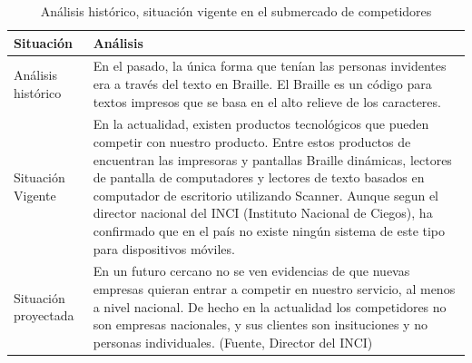 \documentclass[a4paper, 12pt, oneside]{article}
\begin{document}
	\begin{table}
		\caption{Análisis histórico, situación vigente en el submercado de competidores}
		\begin{tabular}{ | p{4cm} | p{10cm} | }
		\hline
		Situación & Análisis \\
		\hline					
		Análisis histórico & 
		En el pasado, la única forma que tenían las personas invidentes era a través del texto en Braille. El Braille es un código para textos impresos que se basa en el alto relieve de los caracteres. \\
		\hline
		Situación Vigente &
		En la actualidad, existen productos tecnológicos que pueden competir con nuestro producto. Entre estos productos de encuentran las impresoras y pantallas Braille dinámicas, lectores de pantalla de computadores y lectores de texto basados en computador de escritorio utilizando Scanner. Aunque segun el director nacional del INCI (Instituto Nacional de Ciegos), ha confirmado que en el país no existe ningún sistema de este tipo para dispositivos móviles. \\
		\hline
		Situación proyectada &
		En un futuro cercano no se ven evidencias de que nuevas empresas quieran entrar a competir en nuestro servicio, al menos a nivel nacional. De hecho en la actualidad los competidores no son empresas nacionales, y sus clientes son insituciones y no personas individuales. (Fuente, Director del INCI)\\
		\hline
		\end{tabular}
		\label{compHistorico}
	\end{table}
	
\end{document}
